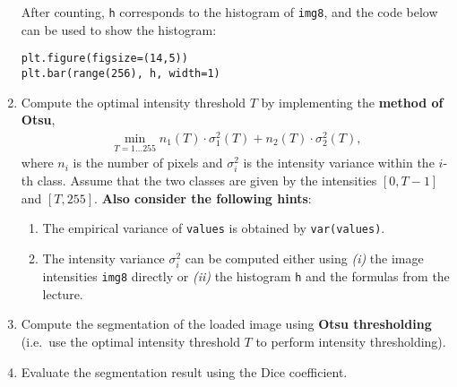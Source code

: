 \documentclass[12pt,a4paper]{article}
\begin{document}
\begin{enumerate}
    After counting, \texttt{h} corresponds to the histogram of \texttt{img8}, and the code below can be used to show the histogram:
\begin{Verbatim}[frame=single]
plt.figure(figsize=(14,5))
plt.bar(range(256), h, width=1)
\end{Verbatim}
    \item Compute the optimal intensity threshold $T$ by implementing the \textbf{method of Otsu},
    \begin{gather}
        \min_{T = 1 \dots 255} n_1\left(T\right) \cdot \sigma_1^2\left(T\right) + n_2\left(T\right) \cdot \sigma_2^2\left(T\right),
    \end{gather}
    where $n_i$ is the number of pixels and $\sigma_i^2$ is the intensity variance within the $i$-th class. Assume that the two classes are given by the intensities $\left[0, T - 1\right]$ and $\left[T, 255\right]$. \textbf{Also consider the following hints}:
    \begin{enumerate}
        \item The empirical variance of \texttt{values} is obtained by \texttt{var(values)}.
        \item The intensity variance $\sigma_i^2$ can be computed either using \textit{(i)} the image intensities \texttt{img8} directly or \textit{(ii)} the histogram \texttt{h} and the formulas from the lecture.
    \end{enumerate}
    \item Compute the segmentation of the loaded image using \textbf{Otsu thresholding} (i.e.\ use the optimal intensity threshold $T$ to perform intensity thresholding).
    \item Evaluate the segmentation result using the Dice coefficient.
\end{enumerate}
\end{document}
